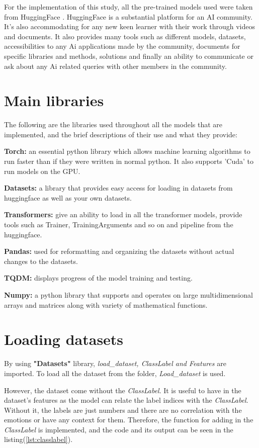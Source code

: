 For the implementation of this study, all the pre-trained models used were taken from HuggingFace \cite{Hugging_Face}. HuggingFace is a substantial platform for an AI community. It's also accommodating for any new keen learner with their work through videos and documents. It also provides many tools such as different models, datasets, accessibilities to any Ai applications made by the community, documents for specific libraries and methods, solutions and finally an ability to communicate or ask about any Ai related queries with other members in the community.

\section{Main libraries}
The following are the libraries used throughout all the models that are implemented, and the brief descriptions of their use and what they provide:

\textbf{Torch:} an essential python library which allows machine learning algorithms to run faster than if they were written in normal python. It also supports 'Cuda' to run models on the GPU.

\textbf{Datasets:} a library that provides easy access for loading in datasets from huggingface as well as your own datasets.

\textbf{Transformers:} give an ability to load in all the transformer models, provide tools such as Trainer, TrainingArguments and so on and pipeline from the huggingface.

\textbf{Pandas:} used for reformatting and organizing the datasets without actual changes to the datasets.

\textbf{TQDM:} displays progress of the model training and testing.

\textbf{Numpy:} a python library that supports and operates on large multidimensional arrays and matrices along with variety of mathematical functions.

\section{Loading datasets}

By using \textbf{"Datasets"} library, \textit{load\_dataset, ClassLabel and Features} are imported. To load all the dataset from the folder, \emph{Load\_dataset} is used. 

However, the dataset come without the \emph{ClassLabel}. It is useful to have in the dataset's features as the model can relate the label indices with the \emph{ClassLabel}. Without it, the labels are just numbers and there are no correlation with the emotions or have any context for them. Therefore, the function for adding in the \emph{ClassLabel} is implemented, and the code and its output can be seen in the listing(\ref{lst:classlabel}). 
\bigskip


